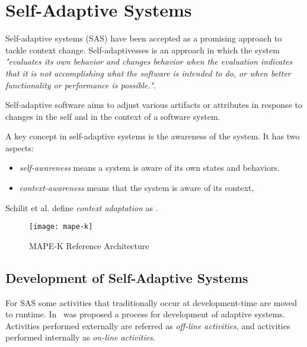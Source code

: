 \section{Self-Adaptive Systems}

Self-adaptive systems (SAS) have been accepted as a promising approach to tackle context change. Self-adaptivesses is an approach in which the system
\emph{"evaluates its own behavior and changes behavior when the evaluation indicates that it is not accomplishing what the software is intended to do, or when better functionality or performance is possible."}\cite{laddaga_self_1997}.

Self-adaptive software aims to adjust various artifacts or attributes in response to changes in the self and in the context of a software system\cite{salehie_self-adaptive_2009}.

A key concept in self-adaptive systems is the awareness of the system. It has two aspects\cite{salehie_self-adaptive_2009}:
\begin{itemize}
   \item \emph{self-awareness} means a system is aware of its own states and behaviors.
   \item \emph{context-awareness} means that the system is aware of its context,
\end{itemize}

Schilit et al.\cite{klein_survey_2008} define \emph{context adaptation} as .

\begin{figure}[!htb]
 \centering
 \texttt{[image: mape-k]}
 \caption{MAPE-K Reference Architecture}
\label{fig:mape-k}
\end{figure}

\subsection{Development of Self-Adaptive Systems}

For SAS some activities that traditionally occur at development-time are moved to runtime.  In~\cite{andersson_software_2013}
was proposed a process for development of adaptive systems.
Activities performed externally are referred as \emph{off-line activities}, and activities performed internally as \emph{on-line activities}.


